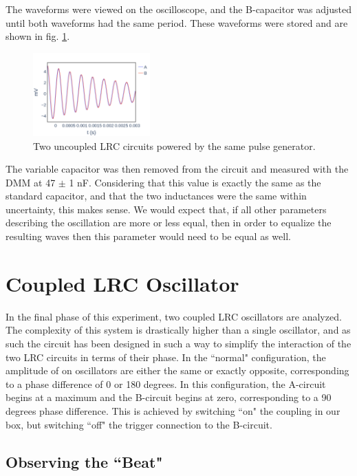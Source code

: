 \documentclass[aps,prl,reprint]{revtex4-2}
\begin{document}
The waveforms were viewed on the oscilloscope, and the B-capacitor
was adjusted until both waveforms had the same period. These
waveforms were stored and are shown in fig. \ref{same}.

\begin{figure}[h]
\includegraphics[width=0.4\textwidth]{../Images/l6_uncoupled_full_window.png}
\caption{\label{same} Two uncoupled LRC circuits powered by the same pulse 
generator. }
\end{figure}

The variable capacitor was then removed from the circuit and measured
with the DMM at 47 $\pm$ 1 nF. Considering that this value is exactly
the same as the standard capacitor, and that the two inductances
were the same within uncertainty, this makes sense. We would expect
that, if all other parameters describing the oscillation are
more or less equal, then in order to equalize the resulting waves
then this parameter would need to be equal as well.


\section{Coupled LRC Oscillator}

In the final phase of this experiment, two coupled LRC oscillators
are analyzed. The complexity of this system is drastically higher
than a single oscillator, and as such the circuit has been designed
in such a way to simplify the interaction of the two LRC circuits
in terms of their phase. In the ``normal" configuration, 
the amplitude of on oscillators are either the same or exactly
opposite, corresponding to a phase difference of 0 or 180 degrees.
In this configuration, the A-circuit begins at a maximum and
the B-circuit begins at zero, corresponding to a 90 degrees phase 
difference. This is achieved by switching ``on" the coupling in
our box, but switching ``off" the trigger connection to the 
B-circuit. \\

\subsection{Observing the ``Beat"}
\end{document}
